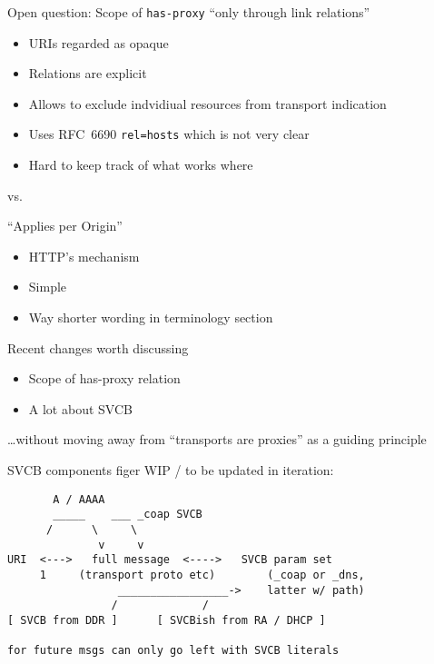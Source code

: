 \begin{frame}{Open question: Scope of \texttt{has-proxy}}\large
  \color{gray}
  ``only through link relations''

  \begin{itemize}
    \color{gray}
    \item URIs regarded as opaque
    \item Relations are explicit
    \item Allows to exclude indvidiual resources from transport indication
    \item Uses RFC~6690 \texttt{rel=hosts} which is not very clear
    \item Hard to keep track of what works where
  \end{itemize}
  
  \color{black}
  \begin{center}
  vs.
  \end{center}

  ``Applies per Origin''

  \begin{itemize}
    \item HTTP's mechanism
    \item Simple
    \item Way shorter wording in terminology section
  \end{itemize}
\end{frame}

\begin{frame}{Recent changes worth discussing}\Large
  \begin{itemize}
    \color{gray} 
    \item Scope of has-proxy relation
    \color{black}
    \item A lot about SVCB
  \end{itemize}

  \bigskip

  \ldots without moving away from ``transports are proxies'' as a guiding principle
\end{frame}

\begin{frame}[fragile]{SVCB components}
  figer WIP / to be updated in iteration:

\begin{verbatim}
       A / AAAA
       _____    ___ _coap SVCB
      /      \     \
              v     v
URI  <--->   full message  <---->   SVCB param set
     1     (transport proto etc)        (_coap or _dns,
                 _________________->    latter w/ path)
                /             /
[ SVCB from DDR ]      [ SVCBish from RA / DHCP ]

for future msgs can only go left with SVCB literals
\end{verbatim}

\end{frame}

